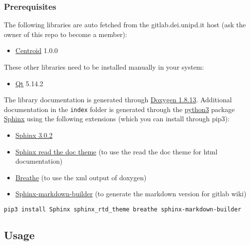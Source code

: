 \hypertarget{prerequisites}{%
\subsubsection{Prerequisites}\label{prerequisites}}

The following libraries are auto fetched from the gitlab.dei.unipd.it
host (ask the owner of this repo to become a member):

\begin{itemize}
\tightlist
\item
  \href{https://gitlab.dei.unipd.it/PAT/Centroid.git}{Centroid} 1.0.0
\end{itemize}

These other libraries need to be installed manually in your system:

\begin{itemize}
\tightlist
\item
  \href{https://www.qt.io/}{Qt} 5.14.2
\end{itemize}

The library documentation is generated through
\href{http://www.doxygen.nl/download.html}{Doxygen 1.8.13}. Additional
documentation in the \texttt{index} folder is generated through the
\href{https://www.anaconda.com/products/individual}{python3} package
\href{https://www.sphinx-doc.org/en/master/}{Sphinx} using the following
extensions (which you can install through pip3):

\begin{itemize}
\tightlist
\item
  \href{https://pypi.org/project/Sphinx/}{Sphinx 3.0.2}
\item
  \href{https://sphinx-rtd-theme.readthedocs.io/en/stable/}{Sphinx read
  the doc theme} (to use the read the doc theme for html documentation)
\item
  \href{https://pypi.org/project/breathe/}{Breathe} (to use the xml
  output of doxygen)
\item
  \href{https://pypi.org/project/sphinx-markdown-builder/}{Sphinx-markdown-builder}
  (to generate the markdown version for gitlab wiki)
\end{itemize}

\texttt{pip3\ install\ Sphinx\ sphinx\_rtd\_theme\ breathe\ sphinx-markdown-builder}

\hypertarget{usage}{%
\subsection{Usage}\label{usage}}

